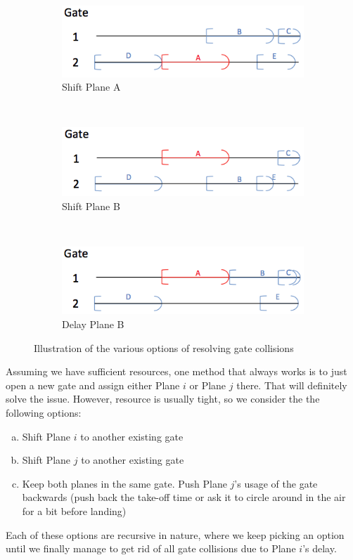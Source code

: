 \documentclass[12pt, a4paper]{report}
\begin{document}
\begin{figure}[h!]
\begin{subfigure}[b]{0.3\textwidth}
	\centering
	\includegraphics[width=\textwidth]{../figures/options1.png}
	\caption{Shift Plane A}
\end{subfigure}~
\begin{subfigure}[b]{0.3\textwidth}
	\centering
	\includegraphics[width=\textwidth]{../figures/options2.png}
	\caption{Shift Plane B}
\end{subfigure}~
\begin{subfigure}[b]{0.3\textwidth}
	\centering
	\includegraphics[width=\textwidth]{../figures/options3.png}
	\caption{Delay Plane B}
\end{subfigure}
\caption{Illustration of the various options of resolving gate collisions}
\end{figure}

Assuming we have sufficient resources, one method that always works is to just open a new gate and assign either Plane $i$ or Plane $j$ there. That will definitely solve the issue. However, resource is usually tight, so we consider the the following options:
\begin{enumerate}[(a)]
\item Shift Plane $i$ to another existing gate
\item Shift Plane $j$ to another existing gate
\item Keep both planes in the same gate. Push Plane $j$'s usage of the gate backwards (push back the take-off time or ask it to circle around in the air for a bit before landing)
\end{enumerate}
Each of these options are recursive in nature, where we keep picking an option until we finally manage to get rid of all gate collisions due to Plane $i$'s delay.
\end{document}
